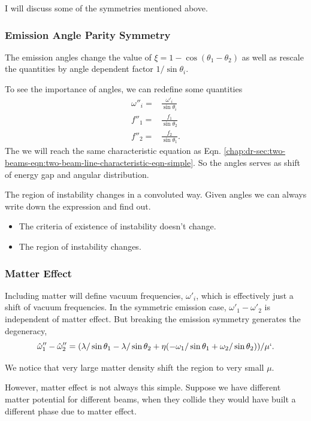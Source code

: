 I will discuss some of the symmetries mentioned above.



\subsubsection{Emission Angle Parity Symmetry}

The emission angles change the value of $\xi=1-\cos(\theta_1-\theta_2)$ as well as rescale the quantities by angle dependent factor $1/\sin\theta_i$.

To see the importance of angles, we can redefine some quantities
\begin{align*}
   \omega''_i=& \frac{\omega'_i}{\sin\theta_i}\\
   f''_1=&\frac{f_1}{\sin\theta_2} \\
   f''_2=&\frac{f_2}{\sin\theta_1}.
\end{align*}
The we will reach the same characteristic equation as Eqn. \ref{chap:dr-sec:two-beams-eqn:two-beam-line-characteristic-eqn-simple}. So the angles serves as shift of energy gap and angular distribution.

The region of instability changes in a convoluted way. Given angles we can always write down the expression and find out.
\begin{itemize}
    \item  The criteria of existence of instability doesn't change.
\item  The region of instability changes.
\end{itemize}


\subsubsection{Matter Effect}


Including matter will define vacuum frequencies, $\omega'_i$, which is effectively just a shift of vacuum frequencies. In the symmetric emission case, $\omega'_1-\omega'_2$ is independent of matter effect. But breaking the emission symmetry generates the degeneracy,
\begin{equation}
   \hat\omega''_1-\hat\omega''_2=( \lambda/\sin\theta_1 - \lambda/\sin\theta_2 + \eta(- \omega_1/\sin\theta_1 + \omega_2/\sin\theta_2) )/\mu`.
\end{equation}

We notice that very large matter density shift the region to very small $\mu$.

However, matter effect is not always this simple. Suppose we have different matter potential for different beams, when they collide they would have built a different phase due to matter effect.


